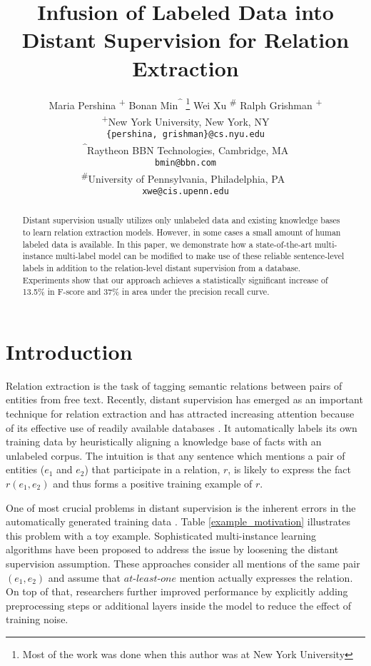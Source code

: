 \documentclass[11pt]{article}
\title{Infusion of Labeled Data into Distant Supervision for Relation Extraction}
\author{Maria Pershina \textsuperscript{+}  Bonan Min\textsuperscript{\^{}}  
\hskip -0.05cm\thanks{\hskip 0.2cm Most of the work was done when this author was at New York University}
 \hskip 0.2cm Wei Xu \textsuperscript{\#} Ralph Grishman \textsuperscript{+}\\
  \textsuperscript{+}New York University, New York, NY \\
  {\tt \{pershina, grishman\}@cs.nyu.edu} \\
  \textsuperscript{\^{}}Raytheon BBN Technologies, Cambridge, MA\\
  {\tt bmin@bbn.com} \\
  \textsuperscript{\#}University of Pennsylvania, Philadelphia, PA\ \\
  {\tt xwe@cis.upenn.edu} 
 }
\date{}
\begin{document}
\maketitle
\begin{abstract}
 
Distant supervision usually utilizes only unlabeled data and existing knowledge bases to learn relation extraction models. 
However, in some cases a small amount of human labeled data is available. In this paper, we demonstrate how a state-of-the-art
multi-instance multi-label model can be modified to make use of these reliable sentence-level labels in addition
to the relation-level distant supervision from a database. Experiments show that our approach achieves a statistically significant increase of 13.5\% in 
F-score and 37\% in area under the precision recall curve.

\end{abstract}

\section{Introduction}

Relation extraction is the task of tagging semantic relations between pairs of entities from free text. Recently, distant supervision has 
emerged as an important technique for relation extraction and has attracted increasing attention because of its effective use of readily 
available databases \cite{mintz09,bunescu07,snyder07,wu07}.
It automatically labels its own training data by heuristically aligning a knowledge base of facts
with an unlabeled corpus. The intuition is that any sentence which mentions a pair of entities ($e_1$ and $e_2$) that 
participate in a relation, $r$, is likely to express the fact $r(e_1,\!e_2)$ and thus forms a positive training example of $r$. 

One of most crucial problems in distant supervision is the inherent errors in the automatically generated training data \cite{roth2013survey}. Table \ref{example_motivation} illustrates this problem
with a toy example.
Sophisticated multi-instance learning algorithms \cite{riedel10,hoffmann11,surdeanu12} have been proposed to 
address the issue by loosening the distant supervision assumption. These approaches consider all mentions of the same pair $(e_1,\!e_2)$ and assume
that $at$-$least$-$one$ mention actually expresses the relation.
On top of that, researchers further improved performance by explicitly adding preprocessing 
steps \cite{takamatsu12,xu13} or additional layers inside the model \cite{ritter13,min13} to reduce the effect of training noise. 
\end{document}
